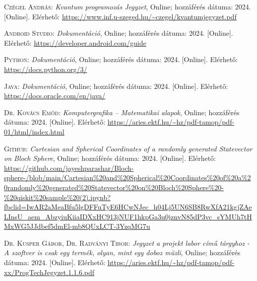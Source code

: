 \documentclass[
]{thesis-ekf}
\theoremstyle{definition}
\theoremstyle{remark}
\begin{document}
\begin{thebibliography}{2}
\textsc{Czégel András}: \emph{Kvantum programozás Jegyzet}, Online; hozzáférés dátuma: 2024. [Online]. Elérhető: \url{https://www.inf.u-szeged.hu/~czegel/kvantumjegyzet.pdf}

\textsc{Android Studio}: \emph{Dokumentáció}, Online; hozzáférés dátuma: 2024. [Online]. Elérhető: \url{https://developer.android.com/guide}

\textsc{Python}: \emph{Dokumentáció}, Online; hozzáférés dátuma: 2024. [Online]. Elérhető: \url{https://docs.python.org/3/}

\textsc{Java}: \emph{Dokumentáció}, Online; hozzáférés dátuma: 2024. [Online]. Elérhető: \url{https://docs.oracle.com/en/java/}

\textsc{Dr. Kovács Emőd}: \emph{Komputergrafika – Matematikai alapok}, Online; hozzáférés dátuma: 2024. [Online]. Elérhető: \url{https://aries.ektf.hu/~hz/pdf-tamop/pdf-01/html/index.html}

\textsc{Github}: \emph{Cartesian and Spherical Coordinates of a randomly generated Statevector on Bloch Sphere}, Online; hozzáférés dátuma: 2024. [Online]. Elérhető: \url{https://github.com/jayeshparashar/Bloch-sphere-/blob/main/Cartesian%20and%20Spherical%20Coordinates%20of%20a%20randomly%20generated%20Statevector%20on%20Bloch%20Sphere%20-%20qiskit%20sample%20(2).ipynb?fbclid=IwAR2aMeaBfu5lgDFFuTyE6HCwNJec_h04Lj5UN6SB8RwXfA21kgjZAeLInsU_aem_AbzyiuKiiaIDXxHC913jNUF1hkpGa3u0jznvN85dP3vc_sYMUh7tHMxWG5JJdbef5dmEl-mb8QUxLCT-3YzqMG7u}

\textsc{Dr. Kusper Gábor, Dr. Radványi Tibor}: \emph{Jegyzet a projekt labor című
	tárgyhoz - A szoftver is csak egy termék, olyan, mint egy doboz müzli}, Online; hozzáférés dátuma: 2024. [Online]. Elérhető: \url{https://aries.ektf.hu/~hz/pdf-tamop/pdf-xx/ProgTechJegyzet.1.1.6.pdf}

\end{thebibliography}


\end{document}
